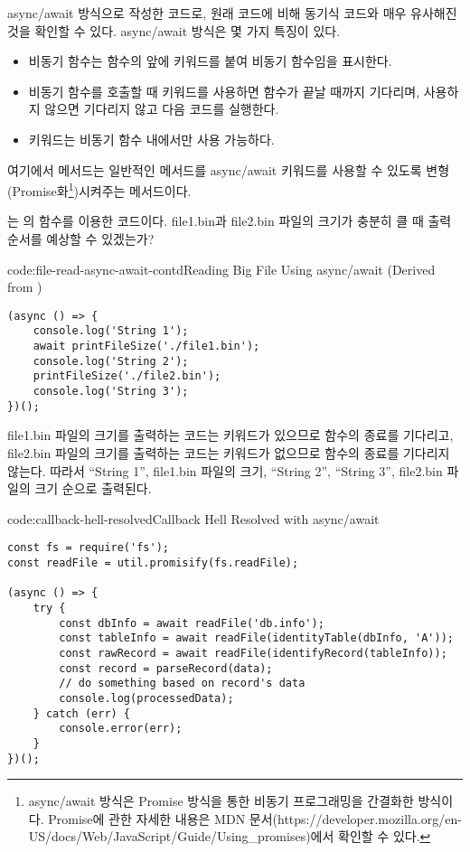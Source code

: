 \은 \를 async/await 방식으로 작성한 코드로, 원래 코드에 비해 동기식 코드와 매우 유사해진 것을 확인할 수 있다. async/await 방식은 몇 가지 특징이 있다.

\begin{itemize}
    \item 비동기 함수는 함수의 앞에  키워드를 붙여 비동기 함수임을 표시한다.
    \item 비동기 함수를 호출할 때  키워드를 사용하면 함수가 끝날 때까지 기다리며, 사용하지 않으면 기다리지 않고 다음 코드를 실행한다.
    \item {} 키워드는 비동기 함수 내에서만 사용 가능하다.
\end{itemize}

여기에서  메서드는 일반적인 메서드를 async/await 키워드를 사용할 수 있도록 변형(Promise화\footnote{async/await 방식은 Promise 방식을 통한 비동기 프로그래밍을 간결화한 방식이다. Promise에 관한 자세한 내용은 MDN 문서(https://developer.mozilla.org/en-US/docs/Web/JavaScript/Guide/Using\_promises)에서 확인할 수 있다.})시켜주는 메서드이다.

는 의  함수를 이용한 코드이다. file1.bin과 file2.bin 파일의 크기가 충분히 클 때 출력 순서를 예상할 수 있겠는가?

\begin{codeenv}{code:file-read-async-await-contd}{Reading Big File Using async/await (Derived from )}\begin{verbatim}
(async () => {
    console.log('String 1');
    await printFileSize('./file1.bin');
    console.log('String 2');
    printFileSize('./file2.bin');
    console.log('String 3');
})();
\end{verbatim}
\end{codeenv}

file1.bin 파일의 크기를 출력하는 코드는  키워드가 있으므로  함수의 종료를 기다리고, file2.bin 파일의 크기를 출력하는 코드는  키워드가 없으므로 함수의 종료를 기다리지 않는다. 따라서 ``String 1'', file1.bin 파일의 크기, ``String 2'', ``String 3'', file2.bin 파일의 크기 순으로 출력된다.

\begin{codeenv}{code:callback-hell-resolved}{Callback Hell Resolved with async/await}\begin{verbatim}
const fs = require('fs');
const readFile = util.promisify(fs.readFile);

(async () => {
    try {
        const dbInfo = await readFile('db.info');
        const tableInfo = await readFile(identityTable(dbInfo, 'A'));
        const rawRecord = await readFile(identifyRecord(tableInfo));
        const record = parseRecord(data);
        // do something based on record's data
        console.log(processedData);
    } catch (err) {
        console.error(err);
    }
})();
\end{verbatim}
\end{codeenv}

